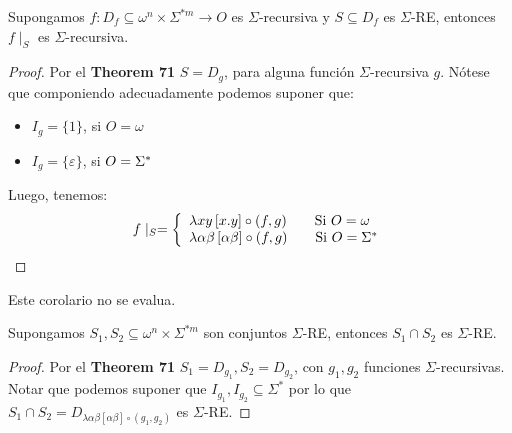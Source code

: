   \begin{corollary}
    \PN Supongamos $f: D_{f} \subseteq \omega^{n} \times \Sigma^{\ast m} \rightarrow O$ es $\Sigma$-recursiva y
    $S\subseteq D_{f}$ es $\Sigma$-RE, entonces $f \mid_{S}$ es $\Sigma$-recursiva.
  \end{corollary}
  \begin{proof}
    \PN Por el \textbf{Theorem 71} $S=D_{g}$, para alguna función $\Sigma$-recursiva $g$. Nótese que componiendo
    adecuadamente podemos suponer que:
    \begin{itemize}
      \item $I_{g} = \{ 1\}$, si $O = \omega$
      \item $I_{g} = \{\varepsilon\}$, si $O = \Sigma^{\ast}$
    \end{itemize}

    \PN Luego, tenemos:
    \[
      f\mid_{S} = \left\{
        \begin{array}{lll}
          \lambda xy \left[x.y\right] \circ (f,g) \qquad \text{Si } O = \omega \\
          \lambda \alpha \beta \left[ \alpha \beta \right] \circ (f,g) \qquad \text{Si } O = \Sigma^{\ast}
        \end{array} \right.
    \]
  \end{proof}

  \begin{corollary}
    \PN Este corolario no se evalua.
  \end{corollary}

  \begin{corollary}
    \PN Supongamos $S_{1}, S_{2} \subseteq \omega^{n} \times \Sigma^{\ast m}$ son conjuntos $\Sigma$-RE, entonces
    $S_{1} \cap S_{2}$ es $\Sigma$-RE.
  \end{corollary}
  \begin{proof}
    \PN Por el \textbf{Theorem 71} $S_{1} = D_{g_{1}}, S_{2} = D_{g_{2}}$, con $g_{1}, g_{2}$ funciones
    $\Sigma$-recursivas. Notar que podemos suponer que $I_{g_{1}}, I_{g_{2}} \subseteq \Sigma^{\ast}$ por lo que $S_{1}
    \cap S_{2} = D_{\lambda \alpha\beta \left[\alpha\beta\right] \circ (g_{1},g_{2})}$ es $\Sigma$-RE.
  \end{proof}


